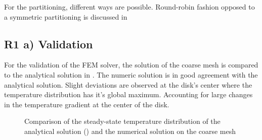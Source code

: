 For the partitioning, different ways are possible. Round-robin fashion opposed to a symmetric partitioning is discussed in 

\subsection{R1 a) Validation}
For the validation of the FEM solver, the solution of the coarse mesh is compared to the analytical solution  in . The numeric solution is in good agreement with the analytical solution. Slight deviations are observed at the disk's center where the temperature distribution has it's global maximum. Accounting for large changes in the temperature gradient at the center of the disk. 

\begin{figure}[!htbp]
	\centering
	\leavevmode
	\resizebox{0.8\width}{!}{}
	\caption{Comparison of the steady-state temperature distribution of the analytical solution () and the numerical solution on the coarse mesh}
	\label{fig::TemperatureDist}
\end{figure}
